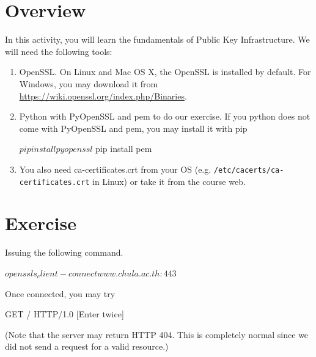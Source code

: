 \documentclass[a4paper, 10pt]{article}
\begin{document}
\subject
{}

\section*{Overview}

In this activity, you will learn the fundamentals of Public Key Infrastructure.
We will need the following tools:
\begin{enumerate}[label=\Alph*.]
	\item OpenSSL. On Linux and Mac OS X, the OpenSSL is installed by default.
				For Windows, you may download it from
				\href{https://wiki.openssl.org/index.php/Binaries}{https://wiki.openssl.org/index.php/Binaries}.
	\item Python with PyOpenSSL and pem to do our exercise.
				If you python does not come with PyOpenSSL and pem, you may install it with pip
				\begin{codingbox}[language=bash]
$ pip install pyopenssl
$ pip install pem
\end{codingbox}
	\item You also need ca-certificates.crt from your OS (e.g. \texttt{/etc/cacerts/ca-certificates.crt} in Linux)
  			or take it from the course web.
\end{enumerate}

\section*{Exercise}

Issuing the following command.
\begin{codingbox}[language=bash]
$ openssl s_client -connect www.chula.ac.th:443
$
\end{codingbox}

\noindent Once connected, you may try
\begin{codingbox}[language=bash]
GET / HTTP/1.0
[Enter twice]
\end{codingbox}

\noindent (Note that the server may return HTTP 404.
This is completely normal since we did not send a request for a valid resource.)
\end{document}
